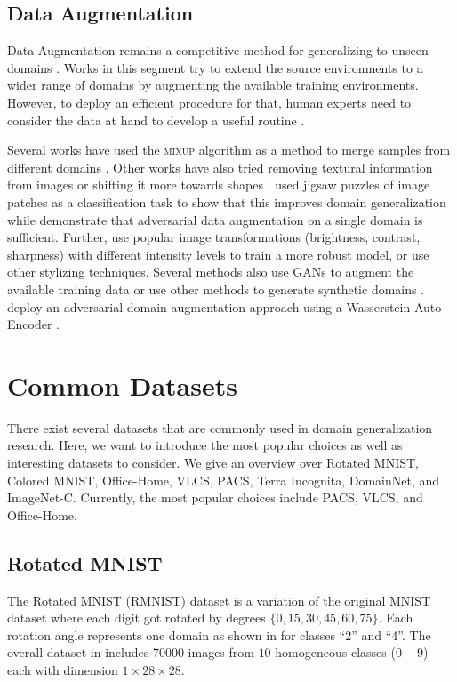 \subsection{Data Augmentation}
Data Augmentation remains a competitive method for generalizing to unseen domains \citep{zhang2019unseen}. Works in this segment try to extend the source environments to a wider range of domains by augmenting the available training environments. However, to deploy an efficient procedure for that, human experts need to consider the data at hand to develop a useful routine \citep{gulrajani2020search}.

Several works have used the \textsc{mixup} \citep{ZhangCDL18} algorithm as a method to merge samples from different domains \citep{XuZNLWTZ20, yan2020improve, WangLK20, mancini2020}. Other works have also tried removing textural information from images \citep{WangHLX19} or shifting it more towards shapes \citep{nam2019reducing, asadi2019shape}. \citet{CarlucciDBCT19} used jigsaw puzzles of image patches as a classification task to show that this improves domain generalization while \citet{VolpiNSDMS18} demonstrate that adversarial data augmentation on a single domain is sufficient. Further, \citet{VolpiM19} use popular image transformations (\eg brightness, contrast, sharpness) with different intensity levels to train a more robust model, or \citet{somavarapu2020frustratingly} use other stylizing techniques. Several methods also use GANs to augment the available training data  \citep{RahmanFBS19, ZhouYHX20, ShankarPCCJS18} or use other methods to generate synthetic domains \citep{zhou2020learning}. \citet{QiaoZP20} deploy an adversarial domain augmentation approach using a Wasserstein Auto-Encoder \citep{TolstikhinBGS18}.

\section{Common Datasets}
There exist several datasets that are commonly used in domain generalization research. Here, we want to introduce the most popular choices as well as interesting datasets to consider. We give an overview over Rotated MNIST, Colored MNIST, Office-Home, VLCS, PACS, Terra Incognita, DomainNet, and ImageNet-C. Currently, the most popular choices include PACS, VLCS, and Office-Home.

\subsection{Rotated MNIST}
The Rotated MNIST (RMNIST) dataset \citep{GhifaryKZB15} is a variation of the original MNIST dataset \citep{lecun-mnisthandwrittendigit-2010} where each digit got rotated by degrees $\{0, 15, 30, 45, 60, 75\}$. Each rotation angle represents one domain as shown in  for classes ``2'' and ``4''. The overall dataset in \citet{gulrajani2020search} includes \num{70000} images from $10$ homogeneous classes ($0-9$) each with dimension $1\times28\times28$.

